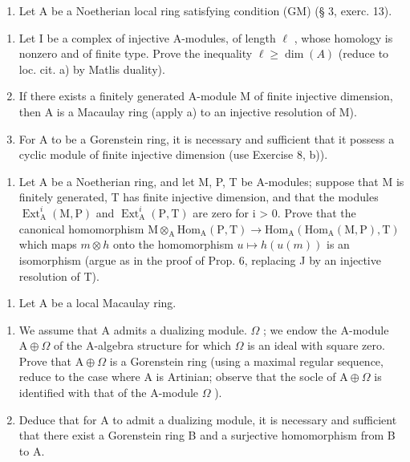 \begin{enumerate}
\def\labelenumi{\arabic{enumi})}
\setcounter{enumi}{8}
\tightlist
\item
  Let A be a Noetherian local ring satisfying condition (GM) (§ 3, exerc. 13).
\end{enumerate}

\begin{enumerate}
\def\labelenumi{\alph{enumi})}
\item
  Let I be a complex of injective A-modules, of length \(\ell\) , whose homology is nonzero and of finite type. Prove the inequality \(\ell \geqslant \dim(A)\) (reduce to loc. cit. a) by Matlis duality).
\item
  If there exists a finitely generated A-module M of finite injective dimension, then A is a Macaulay ring (apply a) to an injective resolution of M).
\item
  For A to be a Gorenstein ring, it is necessary and sufficient that it possess a cyclic module of finite injective dimension (use Exercise 8, b)).
\end{enumerate}

\begin{enumerate}
\def\labelenumi{\arabic{enumi})}
\setcounter{enumi}{9}
\tightlist
\item
  Let A be a Noetherian ring, and let M, P, T be A-modules; suppose that M is finitely generated, T has finite injective dimension, and that the modules \(\operatorname{Ext}_{\mathrm{A}}^{i}(\mathrm{M},\mathrm{P})\) and \(\operatorname{Ext}_{\mathrm{A}}^{i}(\mathrm{P},\mathrm{T})\) are zero for i \textgreater{} 0. Prove that the canonical homomorphism \(\mathrm{M}\otimes_{\mathrm{A}}\mathrm{Hom}_{\mathrm{A}}(\mathrm{P},\mathrm{T})\to\mathrm{Hom}_{\mathrm{A}}(\mathrm{Hom}_{\mathrm{A}}(\mathrm{M},\mathrm{P}),\mathrm{T})\) which maps \(m\otimes h\) onto the homomorphism \(u\mapsto h(u(m))\) is an isomorphism (argue as in the proof of Prop. 6, replacing J by an injective resolution of T).
\end{enumerate}


\begin{enumerate}
\def\labelenumi{\arabic{enumi})}
\tightlist
\item
  Let A be a local Macaulay ring.
\end{enumerate}

\begin{enumerate}
\def\labelenumi{\alph{enumi})}
\item
  We assume that A admits a dualizing module. \(\Omega\) ; we endow the A-module \(\mathrm{A} \oplus \Omega\) of the A-algebra structure for which \(\Omega\) is an ideal with square zero. Prove that \(\mathrm{A} \oplus \Omega\) is a Gorenstein ring (using a maximal regular sequence, reduce to the case where A is Artinian; observe that the socle of \(\mathrm{A} \oplus \Omega\) is identified with that of the A-module \(\Omega\) ).
\item
  Deduce that for A to admit a dualizing module, it is necessary and sufficient that there exist a Gorenstein ring B and a surjective homomorphism from B to A.
\end{enumerate}

